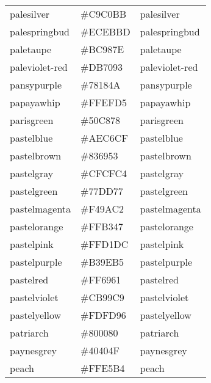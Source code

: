 \documentclass[
]{article}
\begin{document}
\begin{longtable}[]{@{}lll@{}}
palesilver & \colorbox[rgb]{0.79,0.75,0.73}{\#C9C0BB} &
\textcolor[rgb]{0.79,0.75,0.73}{palesilver            }\tabularnewline
palespringbud & \colorbox[rgb]{0.93,0.92,0.74}{\#ECEBBD} &
\textcolor[rgb]{0.93,0.92,0.74}{palespringbud         }\tabularnewline
paletaupe & \colorbox[rgb]{0.74,0.6,0.49}{\#BC987E} &
\textcolor[rgb]{0.74,0.6,0.49}{paletaupe             }\tabularnewline
paleviolet-red & \colorbox[rgb]{0.86,0.44,0.58}{\#DB7093} &
\textcolor[rgb]{0.86,0.44,0.58}{paleviolet-red        }\tabularnewline
pansypurple & \colorbox[rgb]{0.47,0.09,0.29}{\#78184A} &
\textcolor[rgb]{0.47,0.09,0.29}{pansypurple           }\tabularnewline
papayawhip & \colorbox[rgb]{1.0,0.94,0.84}{\#FFEFD5} &
\textcolor[rgb]{1.0,0.94,0.84}{papayawhip            }\tabularnewline
parisgreen & \colorbox[rgb]{0.31,0.78,0.47}{\#50C878} &
\textcolor[rgb]{0.31,0.78,0.47}{parisgreen            }\tabularnewline
pastelblue & \colorbox[rgb]{0.68,0.78,0.81}{\#AEC6CF} &
\textcolor[rgb]{0.68,0.78,0.81}{pastelblue            }\tabularnewline
pastelbrown & \colorbox[rgb]{0.51,0.41,0.33}{\#836953} &
\textcolor[rgb]{0.51,0.41,0.33}{pastelbrown           }\tabularnewline
pastelgray & \colorbox[rgb]{0.81,0.81,0.77}{\#CFCFC4} &
\textcolor[rgb]{0.81,0.81,0.77}{pastelgray            }\tabularnewline
pastelgreen & \colorbox[rgb]{0.47,0.87,0.47}{\#77DD77} &
\textcolor[rgb]{0.47,0.87,0.47}{pastelgreen           }\tabularnewline
pastelmagenta & \colorbox[rgb]{0.96,0.6,0.76}{\#F49AC2} &
\textcolor[rgb]{0.96,0.6,0.76}{pastelmagenta         }\tabularnewline
pastelorange & \colorbox[rgb]{1.0,0.7,0.28}{\#FFB347} &
\textcolor[rgb]{1.0,0.7,0.28}{pastelorange          }\tabularnewline
pastelpink & \colorbox[rgb]{1.0,0.82,0.86}{\#FFD1DC} &
\textcolor[rgb]{1.0,0.82,0.86}{pastelpink            }\tabularnewline
pastelpurple & \colorbox[rgb]{0.7,0.62,0.71}{\#B39EB5} &
\textcolor[rgb]{0.7,0.62,0.71}{pastelpurple          }\tabularnewline
pastelred & \colorbox[rgb]{1.0,0.41,0.38}{\#FF6961} &
\textcolor[rgb]{1.0,0.41,0.38}{pastelred             }\tabularnewline
pastelviolet & \colorbox[rgb]{0.8,0.6,0.79}{\#CB99C9} &
\textcolor[rgb]{0.8,0.6,0.79}{pastelviolet          }\tabularnewline
pastelyellow & \colorbox[rgb]{0.99,0.99,0.59}{\#FDFD96} &
\textcolor[rgb]{0.99,0.99,0.59}{pastelyellow          }\tabularnewline
patriarch & \colorbox[rgb]{0.5,0.0,0.5}{\#800080} &
\textcolor[rgb]{0.5,0.0,0.5}{patriarch             }\tabularnewline
paynesgrey & \colorbox[rgb]{0.25,0.25,0.28}{\#40404F} &
\textcolor[rgb]{0.25,0.25,0.28}{paynesgrey            }\tabularnewline
peach & \colorbox[rgb]{1.0,0.9,0.71}{\#FFE5B4} &
\textcolor[rgb]{1.0,0.9,0.71}{peach                 }\tabularnewline

\end{longtable}
\end{document}
